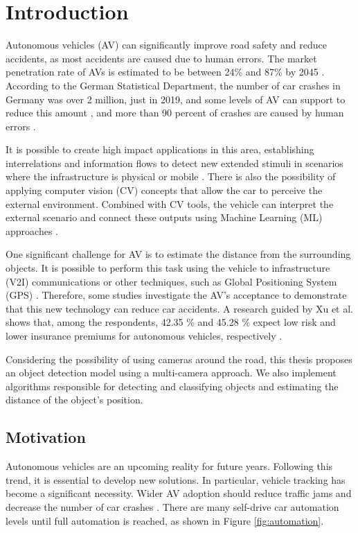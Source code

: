 \chapter{Introduction} \label{introducao}


Autonomous vehicles (AV) can significantly improve road safety and reduce accidents, as most accidents are caused due to human errors. The market penetration rate of AVs is estimated to be between 24\% and 87\% by 2045 \cite{bansal2017forecasting}. According to the German Statistical Department, the number of car crashes in Germany was over 2 million, just in 2019, and some levels of AV can support to reduce this amount \cite{deutsch}, and more than 90 percent of crashes are caused by human errors \cite{car-crash}. 


It is possible to create high impact applications in this area, establishing interrelations and information flows to detect new extended stimuli in scenarios where the infrastructure is physical or mobile \cite{bayat2017environmental}. There is also the possibility of applying computer vision (CV) concepts that allow the car to perceive the external environment. Combined with CV tools, the vehicle can interpret the external scenario and connect these outputs using Machine Learning (ML) approaches \cite{rasouli2019autonomous}.

One significant challenge for AV is to estimate the distance from the surrounding objects. It is possible to perform this task using the vehicle to infrastructure (V2I) communications or other techniques, such as Global Positioning System (GPS) \cite{hobert2015enhancements}. Therefore, some studies investigate the AV's acceptance to demonstrate that this new technology can reduce car accidents. A research guided by Xu et al. shows that, among the respondents, 42.35 \% and 45.28 \% expect low risk and lower insurance premiums for autonomous vehicles, respectively \cite{xu2019autonomous}.

Considering the possibility of using cameras around the road, this thesis proposes an object detection model using a multi-camera approach. We also implement algorithms responsible for detecting and classifying objects and estimating the distance of the object's position.

\section{Motivation}

Autonomous vehicles are an upcoming reality for future years. Following this trend, it is essential to develop new solutions. In particular, vehicle tracking has become a significant necessity. Wider AV adoption should reduce traffic jams and decrease the number of car crashes \cite{bonnefon2016social}. There are many self-drive car automation levels until full automation is reached, as shown in Figure \ref{fig:automation}. 

